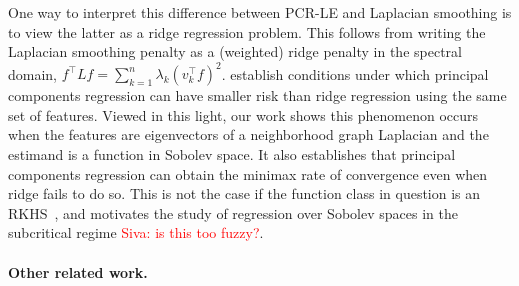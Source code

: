One way to interpret this difference between PCR-LE and Laplacian smoothing is to view the latter as a ridge regression problem. This follows from writing the Laplacian smoothing penalty as a (weighted) ridge penalty in the spectral domain,  $f^{\top} L f  = \sum_{k = 1}^{n} \lambda_k(v_k^{\top}f)^2$. \citet{dhillon2013} establish conditions under which principal components regression can have smaller risk than ridge regression using the same set of features. Viewed in this light, our work shows this phenomenon occurs when the features are eigenvectors of a neighborhood graph Laplacian and the estimand is a function in Sobolev space. It also establishes that principal components regression can obtain the minimax rate of convergence even when ridge fails to do so. This is not the case if the function class in question is an RKHS~\citep{dicker2017}, and motivates the study of regression over Sobolev spaces in the subcritical regime \textcolor{red}{Siva: is this too fuzzy?}.

\paragraph{Other related work.}

